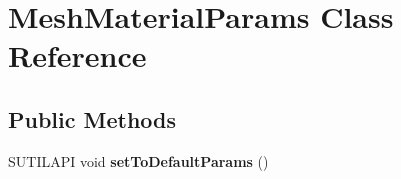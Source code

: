 \hypertarget{class_mesh_material_params}{}\section{Mesh\+Material\+Params Class Reference}
\label{class_mesh_material_params}
\subsection*{Public Methods}
\begin{DoxyCompactItemize}
\item 
\mbox{\label{class_mesh_material_params_acc85cdf4698b8e6b0415bb11ca109009}} 
S\+U\+T\+I\+L\+A\+PI void {\bfseries set\+To\+Default\+Params} ()
\end{DoxyCompactItemize}
